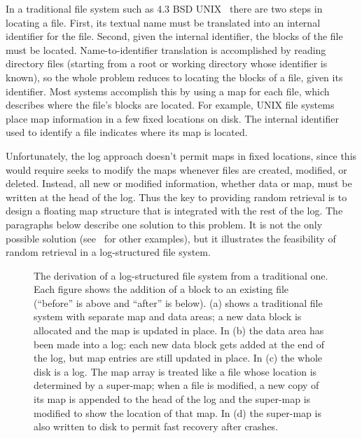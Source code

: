 In a traditional file system such as 4.3 BSD UNIX~\cite{mckusick:unix42}
there are two steps in locating a file.  First, its textual
name must be translated into an internal identifier for the file.
Second, given the internal identifier, the blocks of the file
must be located.  Name-to-identifier translation is accomplished
by reading directory files (starting from a root or
working directory whose identifier is known), so the whole
problem reduces to locating the blocks of a file, given its identifier.
Most systems accomplish this by using a map for each file, which describes
where the file's blocks are located.
For example, UNIX file systems place map information in a few
fixed locations on disk.  The internal identifier used to identify a
file indicates where its map is located.

Unfortunately, the log approach doesn't permit maps in
fixed locations, since this would require seeks to modify the
maps whenever files are created, modified, or deleted.  Instead,
all new or modified information, whether data
or map, must be written at the head of the log.
Thus the key to providing random retrieval is to design a floating
map structure that is integrated with the rest of the log.  The
paragraphs below describe one solution to this problem.
It is not the only possible solution (see~\cite{gait:ofc,garfinkel:cdfs,finlayson:log-files} for other examples),
but it illustrates the feasibility of
random retrieval in a log-structured file system.

\begin{figure*}[t]
 \begin{center}
\caption{The derivation of a log-structured file system from
a traditional one.  Each figure shows the addition of a block to an
existing file (``before'' is above and ``after'' is below).
(a) shows a traditional file system with separate
map and data areas;  a new data block is allocated and
the map is updated in place.  In (b) the data area has been made into
a log:  each new data block gets added at the end of the log, but map
entries are still updated in place.  In (c) the whole disk is a log.
The map array is treated
like a file whose location is determined by a super-map;  when a file
is modified, a new copy of its map is appended to the head of the log
and the super-map is modified to show the location of that map.
In (d) the super-map
is also written to disk to permit fast recovery after crashes.}
\label{derivation}
\end{center}
\normalsize
\end{figure*}

